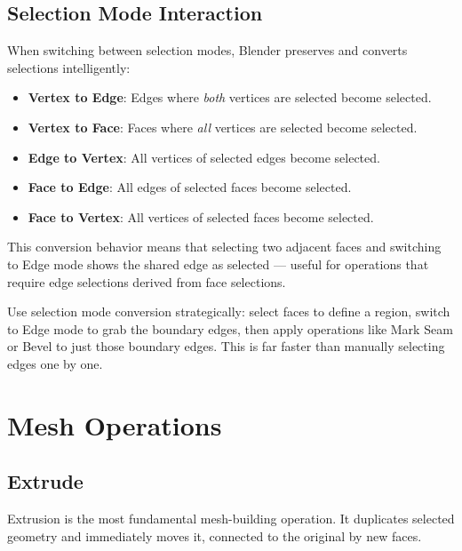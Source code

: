 \subsection{Selection Mode Interaction}
\label{sec:selectioninteraction}

When switching between selection modes, Blender preserves and converts selections intelligently:

\begin{itemize}[leftmargin=2em]
  \item \textbf{Vertex to Edge}: Edges where \textit{both} vertices are selected become selected.
  \item \textbf{Vertex to Face}: Faces where \textit{all} vertices are selected become selected.
  \item \textbf{Edge to Vertex}: All vertices of selected edges become selected.
  \item \textbf{Face to Edge}: All edges of selected faces become selected.
  \item \textbf{Face to Vertex}: All vertices of selected faces become selected.
\end{itemize}

This conversion behavior means that selecting two adjacent faces and switching to Edge mode shows the shared edge as selected --- useful for operations that require edge selections derived from face selections.

\begin{tipbox}
Use selection mode conversion strategically: select faces to define a region, switch to Edge mode to grab the boundary edges, then apply operations like Mark Seam or Bevel to just those boundary edges. This is far faster than manually selecting edges one by one.
\end{tipbox}



\section{Mesh Operations}
\label{sec:meshops}

\subsection{Extrude}
\label{sec:extrude}

Extrusion is the most fundamental mesh-building operation. It duplicates selected geometry and immediately moves it, connected to the original by new faces.


